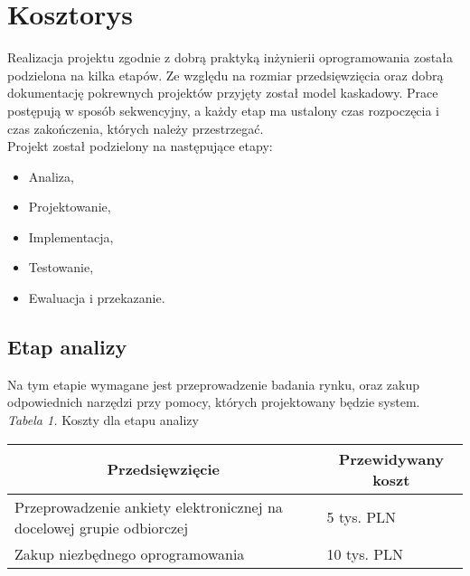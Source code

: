 \documentclass [11pt, a4paper, leqno]	{article}	%
\begin{document}
\section{Kosztorys}
\noindent
Realizacja projektu zgodnie z dobrą praktyką inżynierii oprogramowania została podzielona na kilka etapów. Ze względu na rozmiar przedsięwzięcia oraz dobrą dokumentację pokrewnych projektów przyjęty został model kaskadowy. Prace postępują w sposób sekwencyjny, a każdy etap ma ustalony czas rozpoczęcia i czas zakończenia, których należy przestrzegać. \\

Projekt został podzielony na następujące etapy:
\begin{itemize}
\item Analiza,
\item Projektowanie,
\item Implementacja,
\item Testowanie,
\item Ewaluacja i przekazanie.
\end{itemize}


\subsection{Etap analizy}
\noindent
Na tym etapie wymagane jest przeprowadzenie badania rynku, oraz zakup odpowiednich narzędzi przy pomocy, których projektowany będzie system. \\
\textit{Tabela 1.} Koszty dla etapu analizy

\begin{center}
	\begin{tabular}{| l | l |}
		\hline
		\multicolumn{1}{|c|}{Przedsięwzięcie} & 
		\multicolumn{1}{|c|}{Przewidywany koszt} \\ \hline \hline
		Przeprowadzenie ankiety elektronicznej na docelowej grupie odbiorczej & 5 tys. PLN \\ \hline
		Zakup niezbędnego oprogramowania & 10 tys. PLN \\ \hline
	\end{tabular}
\end{center}
\end{document}
